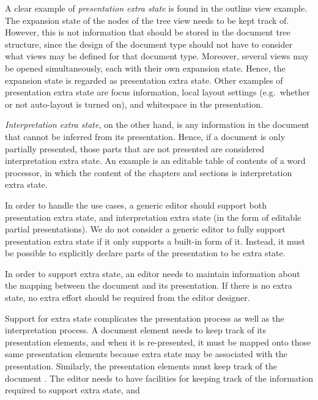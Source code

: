 \documentclass{speauth}
\begin{document}
A clear example of {\em presentation extra state} is found in the outline view example. The expansion state of the nodes of the tree view needs to be kept track of. However, this is not information that should be stored in the document tree structure, since the design of the document type should not have to consider what views may be defined for that document type. Moreover, several views may be opened simultaneously, each with their own expansion state. Hence, the expansion state is regarded as presentation extra state. Other examples of presentation extra state are focus information, local layout settings (e.g.\ whether or not auto-layout is turned on), and whitespace in the presentation. 

{\em Interpretation extra state}, on the other hand, is any information in the document that cannot be inferred from its presentation. Hence, if a document is only partially presented, those parts that are not presented are considered interpretation extra state. An example is an editable table of contents of a word processor, in which the content of the chapters and sections is interpretation extra state.

In order to handle the use cases, a generic editor should support both presentation extra state, and interpretation extra state (in the form of editable partial presentations). We do not consider a generic editor to fully support presentation extra state if it only supports a built-in form of it. Instead, it must be possible to explicitly declare parts of the presentation to be extra state.



In order to support extra state, an editor needs to maintain information about the mapping between the document and its presentation. If there is no extra state, no extra effort should be required from the editor designer. 

\bc
Support for extra state complicates the presentation process as well as the interpretation process. A document element needs to keep track of its presentation elements, and when it is re-presented, it must be mapped onto those same presentation elements because extra state may be associated with the presentation. Similarly, the presentation elements must keep track of the document . The editor needs to have facilities for keeping track of the information required to support extra state, and
\ec
\end{document}
